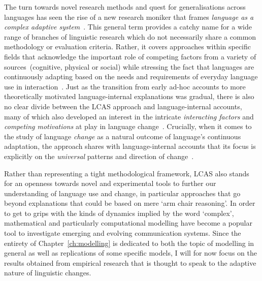 The turn towards novel research methods and quest for generalisations across languages has seen the rise of a new research moniker that frames \emph{language as a complex adaptive system}~\citep[\emph{LCAS} for short, see e.g.][]{Steels1998,Steels2000,Smith2003,Situngkir2004}. This general term provides a catchy name for a wide range of branches of linguistic research which do not necessarily share a common methodology or evaluation criteria. Rather, it covers approaches within specific fields that acknowledge the important role of competing factors from a variety of sources~(cognitive, physical or social) while stressing the fact that languages are continuously adapting based on the needs and requirements of everyday language use in interaction~\citep{LCAS2009}. Just as the transition from early ad-hoc accounts to more theoretically motivated language-internal explanations was gradual, there is also no clear divide between the LCAS approach and language-internal accounts, many of which also developed an interest in the intricate \emph{interacting factors} and \emph{competing motivations} at play in language change~\citep{Vachek1962,Berg1998,Thomsen2006,Wedel2009,MacWhinney2014}.
Crucially, when it comes to the study of language \emph{change} as a natural outcome of language's continuous adaptation, the approach shares with language-internal accounts that its focus is explicitly on the \emph{universal} patterns and direction of change~\citep[p.4-5]{LCAS2009}.

Rather than representing a tight methodological framework, LCAS also stands for an openness towards novel and experimental tools to further our understanding of language use and change, in particular approaches that go beyond explanations that could be based on mere `arm chair reasoning'. In order to get to grips with the kinds of dynamics implied by the word `complex', mathematical and particularly computational modelling have become a popular tool to investigate emerging and evolving communication systems. Since the entirety of Chapter~\ref{ch:modelling} is dedicated to both the topic of modelling in general as well as replications of some specific models, I will for now focus on the results obtained from empirical research that is thought to speak to the adaptive nature of linguistic changes.

